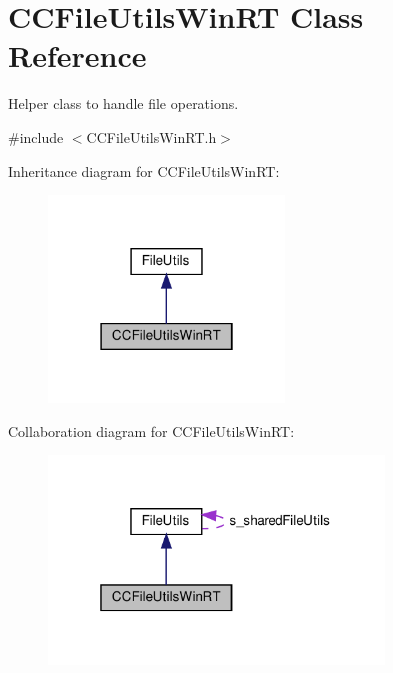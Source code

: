 \hypertarget{classCCFileUtilsWinRT}{}\section{C\+C\+File\+Utils\+Win\+RT Class Reference}
\label{classCCFileUtilsWinRT}


Helper class to handle file operations.  




{\ttfamily \#include $<$C\+C\+File\+Utils\+Win\+R\+T.\+h$>$}



Inheritance diagram for C\+C\+File\+Utils\+Win\+RT\+:
\nopagebreak
\begin{figure}[H]
\begin{center}
\leavevmode
\includegraphics[width=178pt]{classCCFileUtilsWinRT__inherit__graph}
\end{center}
\end{figure}


Collaboration diagram for C\+C\+File\+Utils\+Win\+RT\+:
\nopagebreak
\begin{figure}[H]
\begin{center}
\leavevmode
\includegraphics[width=253pt]{classCCFileUtilsWinRT__coll__graph}
\end{center}
\end{figure}
